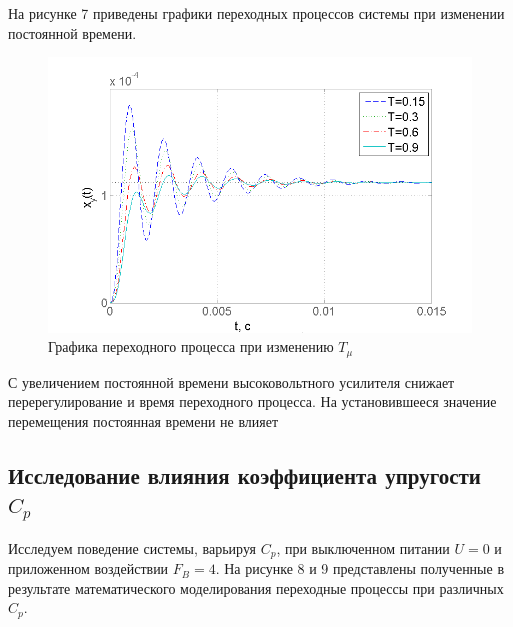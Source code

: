 \documentclass[a4paper, 12pt]{article}
\begin{document}
На рисунке 7 приведены графики переходных процессов системы при изменении постоянной времени.
\begin{figure}[h]
	\centering
	\includegraphics[width=0.7\linewidth]{8}
	\caption{Графика переходного процесса при изменению $T_{\mu}$}
	\label{}
\end{figure}

С увеличением постоянной времени высоковольтного усилителя снижает перерегулирование и время переходного процесса. На установившееся значение перемещения постоянная времени не влияет

\newpage
\begin{center}
	\section{Исследование влияния коэффициента упругости $C_p$}
\end{center} \par
Исследуем поведение системы, варьируя $C_p$, при выключенном питании $U = 0$ и приложенном воздействии $F_B = 4$. На рисунке 8 и 9 представлены полученные в результате математического моделирования переходные процессы при различных $C_p$.
\end{document}
